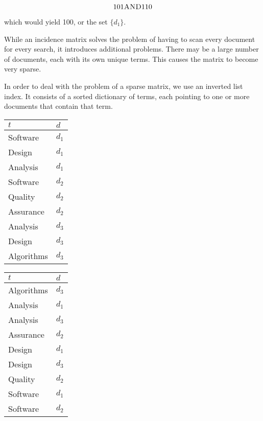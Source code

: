 \begin{ex}
		$$101 \textsc{AND} 110$$
		
		which would yield 100, or the set $\{d_1\}$.
		
		While an incidence matrix solves the problem of having to scan every document for every search, it introduces additional problems.  There may be a large number of documents, each with its own unique terms.  This causes the matrix to become very sparse.
		
		In order to deal with the problem of a sparse matrix, we use an inverted list index.  It consists of a sorted dictionary of terms, each pointing to one or more documents that contain that term.
		
		\begin{table}[!ht]
			\centering
			
			\begin{subtable}[b]{.3\textwidth}
				\begin{tabular}{ll}
					\toprule
					$t$ & $d$ \\
					\midrule
					Software & $d_1$ \\
					Design & $d_1$ \\
					Analysis & $d_1$ \\
					Software & $d_2$ \\
					Quality & $d_2$ \\
					Assurance & $d_2$ \\
					Analysis & $d_3$ \\
					Design & $d_3$ \\
					Algorithms & $d_3$ \\
					\bottomrule
				\end{tabular}
				
				\label{tbl:inverted-list-index-initial}
			\end{subtable}
			
			\begin{subtable}[b]{0.3\textwidth}
				\begin{tabular}{ll}
					\toprule
					$t$ & $d$ \\
					\midrule
					Algorithms & $d_3$ \\
					Analysis & $d_1$ \\
					Analysis & $d_3$ \\
					Assurance & $d_2$ \\
					Design & $d_1$ \\
					Design & $d_3$ \\
					Quality & $d_2$ \\
					Software & $d_1$ \\
					Software & $d_2$ \\
					\bottomrule
				\end{tabular}
			

\end{subtable}
\end{table}
\end{ex}
